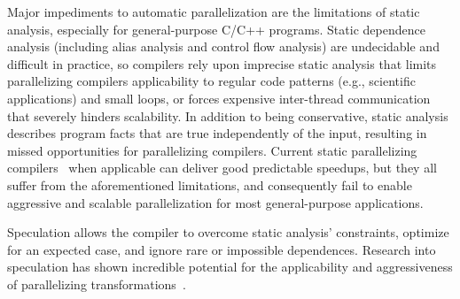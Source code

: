 Major impediments to automatic parallelization are the limitations of static
analysis, especially for general-purpose C/C++ programs. Static dependence
analysis (including alias analysis and control flow analysis) are undecidable
and difficult in practice, so compilers rely upon imprecise static analysis that
limits parallelizing compilers applicability to regular code patterns (e.g.,
scientific applications) and small loops, or forces expensive inter-thread
communication that severely hinders scalability.
%
In addition to being conservative, static analysis describes program facts that
are true independently of the input, resulting in missed opportunities for
parallelizing compilers.
Current static parallelizing compilers~\cite{campanoni:2012:iscgo,
raman:2008:iscgo, suif:94:stanford} when applicable can deliver good predictable
speedups, but they all suffer from the aforementioned limitations, and
consequently fail to enable aggressive and scalable parallelization for most
general-purpose applications.

Speculation allows the compiler to overcome static analysis' constraints,
optimize for an expected
case, and ignore rare or impossible dependences.  Research into speculation has
shown incredible potential for the applicability and aggressiveness of
parallelizing transformations~\cite{zhong:08:hpca, johnson:12:pldi:short}.
%

